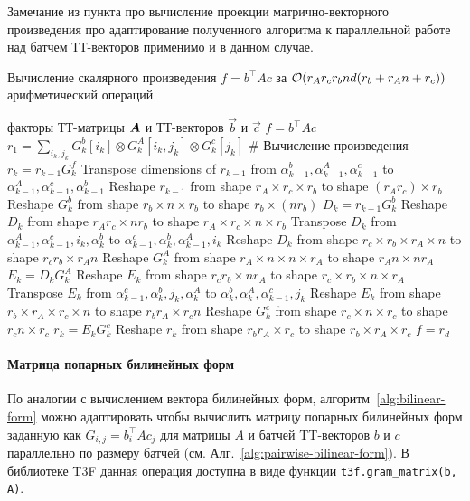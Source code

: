 Замечание из пункта про вычисление проекции матрично-векторного произведения про адаптирование полученного алгоритма к параллельной работе над батчем ТТ-векторов применимо и в данном случае.
%
\begin{algorithm}[tb]
   \caption{Вычисление скалярного произведения $f = b^\intercal A c$ за $\mathcal{O}(r_A r_c r_b n d (r_b + r_A n + r_c))$ арифметический операций}
   \label{alg:bilinear-form}
\begin{algorithmic}[1]
   \REQUIRE факторы ТТ-матрицы $\boldsymbol{A}$ и ТТ-векторов $\vec{b}$ и $\vec{c}$
   \ENSURE $f = b^\intercal A c$
   \STATE $r_1 = \sum_{i_k, j_k} G_k^b[i_k] \otimes G_k^A[i_k, j_k] \otimes G_k^c[j_k]$
   \STATE \# Вычисление произведения $r_k = r_{k-1}G_k^f$
   \STATE Transpose dimensions of $r_{k-1}$ from $\alpha_{k-1}^b,\alpha_{k-1}^A, \alpha_{k-1}^c$ to $\alpha_{k-1}^A, \alpha_{k-1}^c,\alpha_{k-1}^b$
   \STATE Reshape $r_{k-1}$ from shape $r_A \times r_c \times r_b$ to shape $(r_A  r_c) \times r_b$
   \STATE Reshape $G_k^b$ from shape $r_b \times n \times r_b$ to shape $r_b \times (n r_b)$
   \STATE $D_k = r_{k-1} G_k^b$ 
   \STATE Reshape $D_k$ from shape $r_A r_c \times n r_b$ to shape $r_A \times r_c \times n \times r_b$
   \STATE Transpose $D_k$ from $\alpha_{k-1}^A, \alpha_{k-1}^c,i_k,\alpha_{k}^b$ to $\alpha_{k-1}^c,\alpha_{k}^b,\alpha_{k-1}^A,i_k$
   \STATE Reshape $D_k$ from shape $r_c \times r_b \times r_A \times n$ to shape $r_c r_b \times r_A n$
   \STATE Reshape $G_k^A$ from shape $r_A \times n \times n \times r_A$ to shape $r_A n \times n r_A$
   \STATE $E_k = D_k G_k^A$ 
   \STATE Reshape $E_k$ from shape $r_c r_b \times n r_A$ to shape $r_c \times r_b \times n \times r_A$
   \STATE Transpose $E_k$ from $\alpha_{k-1}^c, \alpha_{k}^b,j_k,\alpha_{k}^A$ to $\alpha_{k}^b,\alpha_{k}^A,\alpha_{k-1}^c,j_k$
   \STATE Reshape $E_k$ from shape $r_b \times r_A \times r_c \times n$ to shape $r_b r_A \times r_c n$
   \STATE Reshape $G_k^c$ from shape $r_c \times n \times r_c$ to shape $r_c n \times r_c$
   \STATE $r_k = E_k G_k^c$ 
   \STATE Reshape $r_k$ from shape $r_b r_A \times r_c$ to shape $r_b \times r_A \times r_c$
   \ENDFOR
   \STATE $f = r_d$
\end{algorithmic}
\end{algorithm}



\paragraph{Матрица попарных билинейных форм}
По аналогии с вычислением вектора билинейных форм, алгоритм~\ref{alg:bilinear-form} можно адаптировать чтобы  вычислить матрицу попарных билинейных форм заданную как $G_{i,j} = b_i^\intercal A c_j$ для матрицы $A$ и батчей TT-векторов $b$ и $c$ параллельно по размеру батчей (см. Алг.~\ref{alg:pairwise-bilinear-form}). В библиотеке T3F данная операция доступна в виде функции \texttt{t3f.gram\_matrix(b, A)}.

